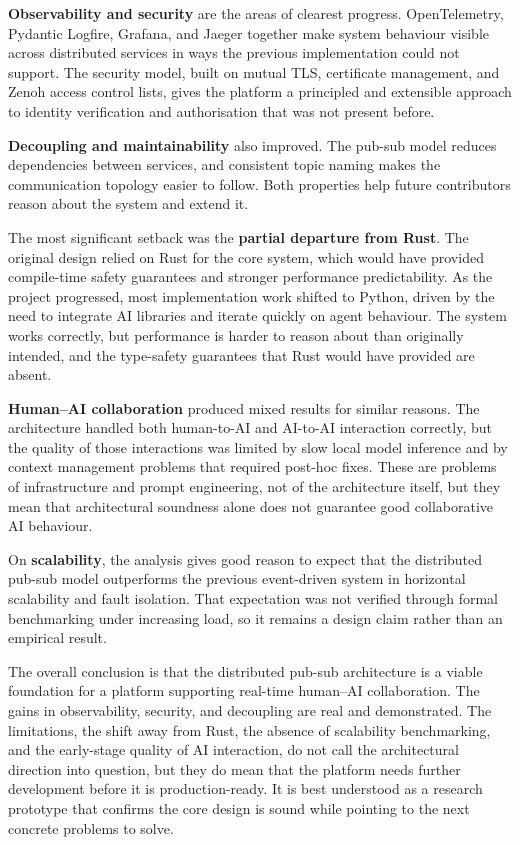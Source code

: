 \documentclass[11pt]{article}
\begin{document}
\textbf{Observability and security} are the areas of clearest progress. OpenTelemetry, Pydantic Logfire, Grafana, and Jaeger together make system behaviour visible across distributed services in ways the previous implementation could not support. The security model, built on mutual TLS, certificate management, and Zenoh access control lists, gives the platform a principled and extensible approach to identity verification and authorisation that was not present before.

\textbf{Decoupling and maintainability} also improved. The pub-sub model reduces dependencies between services, and consistent topic naming makes the communication topology easier to follow. Both properties help future contributors reason about the system and extend it.

The most significant setback was the \textbf{partial departure from Rust}. The original design relied on Rust for the core system, which would have provided compile-time safety guarantees and stronger performance predictability. As the project progressed, most implementation work shifted to Python, driven by the need to integrate AI libraries and iterate quickly on agent behaviour. The system works correctly, but performance is harder to reason about than originally intended, and the type-safety guarantees that Rust would have provided are absent.

\textbf{Human--AI collaboration} produced mixed results for similar reasons. The architecture handled both human-to-AI and AI-to-AI interaction correctly, but the quality of those interactions was limited by slow local model inference and by context management problems that required post-hoc fixes. These are problems of infrastructure and prompt engineering, not of the architecture itself, but they mean that architectural soundness alone does not guarantee good collaborative AI behaviour.

On \textbf{scalability}, the analysis gives good reason to expect that the distributed pub-sub model outperforms the previous event-driven system in horizontal scalability and fault isolation. That expectation was not verified through formal benchmarking under increasing load, so it remains a design claim rather than an empirical result.

The overall conclusion is that the distributed pub-sub architecture is a viable foundation for a platform supporting real-time human--AI collaboration. The gains in observability, security, and decoupling are real and demonstrated. The limitations, the shift away from Rust, the absence of scalability benchmarking, and the early-stage quality of AI interaction, do not call the architectural direction into question, but they do mean that the platform needs further development before it is production-ready. It is best understood as a research prototype that confirms the core design is sound while pointing to the next concrete problems to solve.
\end{document}
